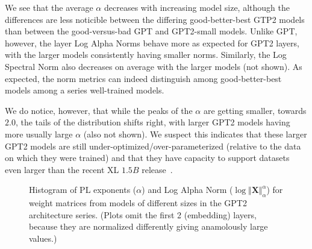 We see that the average $\alpha$ decreases with increasing model size, although the differences are less noticible between the differing good-better-best GTP2 models than between the good-versus-bad GPT and GPT2-small models.
Unlike GPT, however, the layer Log Alpha Norms behave more as expected for GPT2 layers, with the larger models consistently having smaller norms. 
Similarly, the Log Spectral Norm also decreases on average with the larger models (not shown).  
As expected, the norm metrics can indeed distinguish among good-better-best models among a series well-trained models.

We do notice, however, that while the peaks of the $\alpha$ are getting smaller, towards $2.0$, the tails of the distribution shifts right, with larger GPT2 models having more usually large $\alpha$ (also not shown).  
We suspect this indicates that these larger GPT2 models are still under-optimized/over-parameterized (relative to the data on which they were trained) and that they have capacity to support datasets even larger than the recent XL $1.5B$ release~\cite{gpt2-xl}.

\begin{figure}[htb]
    \centering

    \quad
    \caption{Histogram of PL exponents ($\alpha$)
              and Log Alpha Norm ($\log\Vert\mathbf{X}\Vert_{\alpha}^{\alpha}$) for weight matrices from models of different sizes in the GPT2 architecture series.  (Plots omit the first 2 (embedding) layers, because they are normalized differently giving anamolously large values.)
             }
    \label{fig:gpt2-histograms}
\end{figure}
